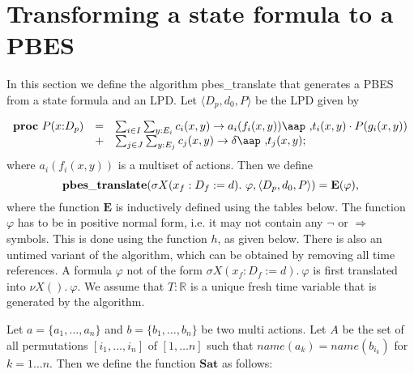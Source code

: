 \documentclass{article}
\begin{document}
\section{Transforming a state formula to a PBES}

In this section we define the algorithm pbes\_translate that generates a
PBES from a state formula and an LPD. Let $\langle {D_p, d_0, P} \rangle $
be the LPD given by

\begin{equation*}
\begin{array}{lrl}
\mathbf{proc}~P(x{:}D_{p}) & = & \sum_{i\in
I}\sum_{y:E_{i}}c_{i}(x,y)\rightarrow a_{i}(f_{i}(x,y))\mbox{\aap ,}%
t_{i}(x,y)\cdot P(g_{i}(x,y)) \\
& + & \sum_{j\in J}\sum_{y:E_{j}}c_{j}(x,y)\rightarrow \delta \mbox{\aap ,}%
t_{j}(x,y);%
\end{array}%
\end{equation*}%
where $a_{i}(f_{i}(x,y))$ is a multiset of actions. Then we define
\begin{equation*}
\mathbf{pbes\_translate}(\sigma X(x_{f}:D_{f}:=d).~\varphi ,\langle {%
D_{p},d_{0},P}\rangle )=\mathbf{E}(\varphi ),
\end{equation*}%
where the function $\mathbf{E}$ is inductively defined using the tables
below. The function $\varphi $ has to be in positive normal form, i.e. it
may not contain any $\lnot $ or $\Rightarrow $ symbols. This is done using
the function $h$, as given below. There is also an untimed variant of the
algorithm, which can be obtained by removing all time references. A formula $%
\varphi $ not of the form $\sigma X(x_{f}:D_{f}:=d).~\varphi $ is first
translated into $\nu X().~\varphi $. We assume that $T:\mathbb{R}$ is a
unique fresh time variable that is generated by the algorithm.

\vspace{1cm}

Let $a=\{a_{1},\ldots ,a_{n}\}$ and $b=\{b_{1},\ldots ,b_{n}\}$ be two multi
actions. Let $A$ be the set of all permutations $[i_{1},\ldots ,i_{n}]$ of $%
[1,\ldots n]$ such that $name(a_{k})=name(b_{i_{k}})$ for $k=1\ldots n$.
Then we define the function $\mathbf{Sat}$ as follows:
\end{document}
